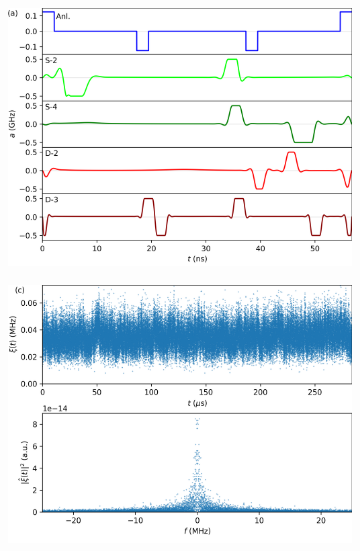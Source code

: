 \documentclass[
  amsfonts,
  amsmath,
  tbtags,
  amssymb,
  aps,
  nobibnotes,
  twocolumn,
]{revtex4-2}
\begin{document}
\begin{figure}[ht]
  \begin{subfigure}{.5\linewidth}
    \includegraphics[width=\linewidth]{assets/f3a.png}
  \end{subfigure}%
  \begin{subfigure}{.5\linewidth}
    \includegraphics[width=\linewidth]{assets/f3c.png}
  \end{subfigure}
  

\end{figure}
\end{document}

